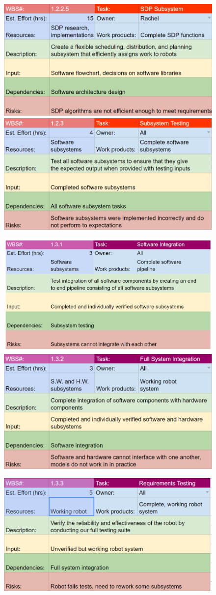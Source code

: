 \begin{figure}[h!]
\centering
\includegraphics[width=0.49\columnwidth]{wbs_schedule/wbs_dict_sw6.png}
\includegraphics[width=0.49\columnwidth]{wbs_schedule/wbs_dict_sw7.png}
\label{fig:sw6sw7}
\end{figure}
\begin{figure}[h!]
\centering
\includegraphics[width=0.49\columnwidth]{wbs_schedule/wbs_dict_int1.png}
\includegraphics[width=0.49\columnwidth]{wbs_schedule/wbs_dict_int2.png}
\label{fig:int1int2}
\end{figure}
\begin{figure}[h!]
\centering
\includegraphics[width=0.49\columnwidth]{wbs_schedule/wbs_dict_int3.png}
\label{fig:int3}
\end{figure}

